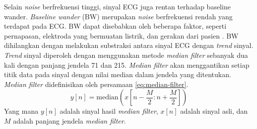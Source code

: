 

%
Selain \textit{noise} berfrekuensi tinggi, sinyal ECG juga rentan terhadap
baseline wander.
\textit{Baseline wander} (BW) merupakan \textit{noise} berfrekuensi rendah yang terdapat pada ECG.
BW dapat disebabkan oleh beberapa faktor, seperti pernapasan, elektroda yang bermuatan listrik, dan gerakan dari pasien \parencite{lenisComparisonBaselineWander2017}.
BW dihilangkan dengan melakukan substraksi antara sinyal ECG dengan \textit{trend} sinyal.
\textit{Trend} sinyal diperoleh dengan menggunakan metode \textit{median filter} sebanyak dua kali dengan panjang jendela 71 dan 215.
\textit{Median filter} akan menggantikan setiap titik data pada sinyal dengan nilai median dalam jendela yang ditentukan.
\textit{Median filter} didefinisikan oleh persamaan \ref{eq:median-filter}.
\begin{equation}
    y[n] = \text{median}(x[n - \frac{M}{2} : n + \frac{M}{2}])
    \label{eq:median-filter}
\end{equation}
Yang mana $y[n]$ adalah sinyal hasil \textit{median filter}, $x[n]$ adalah sinyal asli, dan $M$ adalah panjang jendela \textit{median filter}.

